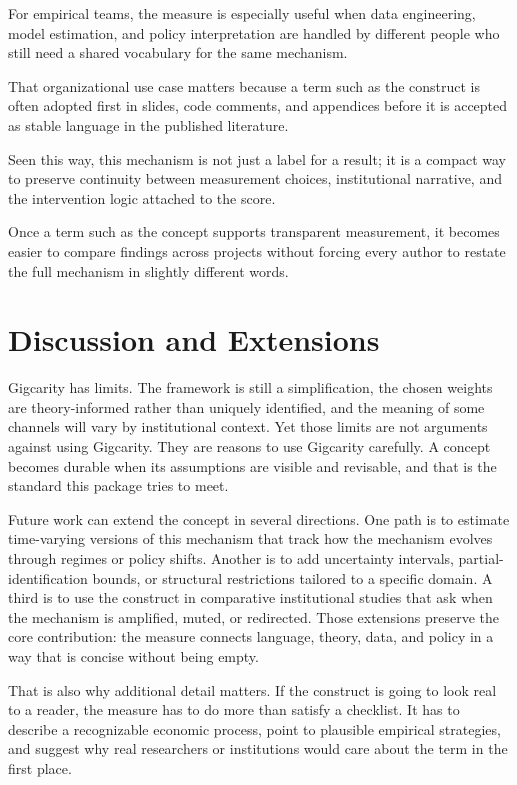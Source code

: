 \documentclass[12pt]{article}
\begin{document}
For empirical teams, the measure is especially useful when data engineering, model estimation, and policy interpretation are handled by different people who still need a shared vocabulary for the same mechanism.

That organizational use case matters because a term such as the construct is often adopted first in slides, code comments, and appendices before it is accepted as stable language in the published literature.

Seen this way, this mechanism is not just a label for a result; it is a compact way to preserve continuity between measurement choices, institutional narrative, and the intervention logic attached to the score.

Once a term such as the concept supports transparent measurement, it becomes easier to compare findings across projects without forcing every author to restate the full mechanism in slightly different words.

\section{Discussion and Extensions}
Gigcarity has limits. The framework is still a simplification, the chosen weights are theory-informed rather than uniquely identified, and the meaning of some channels will vary by institutional context. Yet those limits are not arguments against using Gigcarity. They are reasons to use Gigcarity carefully. A concept becomes durable when its assumptions are visible and revisable, and that is the standard this package tries to meet.

Future work can extend the concept in several directions. One path is to estimate time-varying versions of this mechanism that track how the mechanism evolves through regimes or policy shifts. Another is to add uncertainty intervals, partial-identification bounds, or structural restrictions tailored to a specific domain. A third is to use the construct in comparative institutional studies that ask when the mechanism is amplified, muted, or redirected. Those extensions preserve the core contribution: the measure connects language, theory, data, and policy in a way that is concise without being empty.

That is also why additional detail matters. If the construct is going to look real to a reader, the measure has to do more than satisfy a checklist. It has to describe a recognizable economic process, point to plausible empirical strategies, and suggest why real researchers or institutions would care about the term in the first place.
\end{document}

